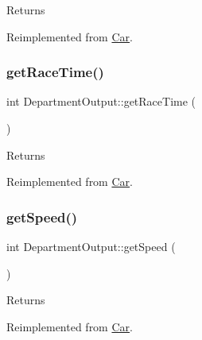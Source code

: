 \begin{DoxyReturn}{Returns}

\end{DoxyReturn}


Reimplemented from \hyperlink{classCar_a0e0b71dc2b09be094ffb08e5b73c8ea2}{Car}.

\mbox{\label{classDepartmentOutput_af4807c0cdde8488cd922be5d15a0f59b}} 
\subsubsection{\texorpdfstring{get\+Race\+Time()}{getRaceTime()}}
{\footnotesize\ttfamily int Department\+Output\+::get\+Race\+Time (\begin{DoxyParamCaption}{ }\end{DoxyParamCaption})\hspace{0.3cm}{\ttfamily [virtual]}}

\begin{DoxyReturn}{Returns}

\end{DoxyReturn}


Reimplemented from \hyperlink{classCar_ac30e13eba209c1ca3bba99bf6741094a}{Car}.

\mbox{\label{classDepartmentOutput_a90caf8934a687d18b9855f19a421ecef}} 
\subsubsection{\texorpdfstring{get\+Speed()}{getSpeed()}}
{\footnotesize\ttfamily int Department\+Output\+::get\+Speed (\begin{DoxyParamCaption}{ }\end{DoxyParamCaption})\hspace{0.3cm}{\ttfamily [virtual]}}

\begin{DoxyReturn}{Returns}

\end{DoxyReturn}


Reimplemented from \hyperlink{classCar_a18e48b5cf9815216b8e82351d36b8d9f}{Car}.



